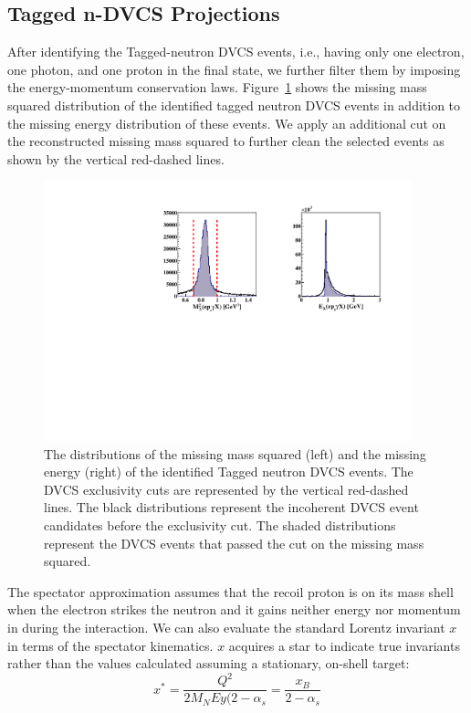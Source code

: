 \subsection{Tagged n-DVCS Projections}
After identifying the Tagged-neutron DVCS events, i.e., having only one 
electron, one photon, and one proton in the final state, we further filter them 
by imposing the energy-momentum conservation laws.  
Figure~\ref{fig:tagged_exclusive} shows the missing mass squared distribution 
of the identified tagged neutron DVCS events in addition to the missing energy 
distribution of these events. We apply an additional cut on the reconstructed 
missing mass squared to further clean the selected events as shown by the 
vertical red-dashed lines. 

\begin{figure}[htb]
  \centering
    \includegraphics[width=0.95\textwidth,clip]{figs/all_inincoh_exc_cuts.pdf}
  \caption{The distributions of the missing mass squared (left) and the missing 
   energy (right) of the identified Tagged neutron DVCS events. The DVCS 
   exclusivity cuts are represented by the vertical red-dashed lines. The black 
   distributions represent the incoherent DVCS event candidates before the 
   exclusivity cut. The shaded distributions represent the DVCS events that 
   passed the cut on the missing mass squared.
   \label{fig:tagged_exclusive}}
\end{figure}

The spectator approximation assumes that the recoil proton is on its mass shell 
when the electron strikes the neutron and it gains neither energy nor momentum 
in during the interaction. We can also evaluate the standard Lorentz invariant 
$x$ in terms of the spectator kinematics. $x$ acquires a star to indicate  true 
invariants rather than the values calculated assuming a stationary, on-shell 
target:
\begin{equation}
   x^* = \frac{Q^2}{2M_{N}Ey (2-\alpha_s} = \frac{x_B}{2-\alpha_s}
\end{equation} 

